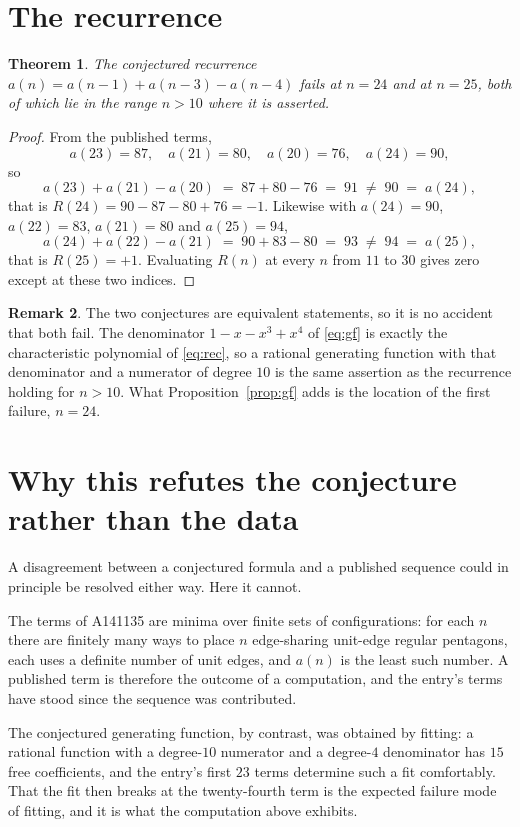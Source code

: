 \documentclass[11pt,a4paper]{article}
\theoremstyle{plain}
\newtheorem{theorem}{Theorem}
\theoremstyle{definition}
\newtheorem{remark}[theorem]{Remark}
\begin{document}
\section{The recurrence}

\begin{theorem}\label{thm:rec}
The conjectured recurrence $a(n)=a(n-1)+a(n-3)-a(n-4)$ fails at $n=24$ and at $n=25$, both
of which lie in the range $n>10$ where it is asserted.
\end{theorem}

\begin{proof}
From the published terms,
\[
a(23)=87,\quad a(21)=80,\quad a(20)=76,\quad a(24)=90,
\]
so
\[
a(23)+a(21)-a(20)\;=\;87+80-76\;=\;91\;\ne\;90\;=\;a(24),
\]
that is $R(24)=90-87-80+76=-1$. Likewise with $a(24)=90$, $a(22)=83$, $a(21)=80$ and
$a(25)=94$,
\[
a(24)+a(22)-a(21)\;=\;90+83-80\;=\;93\;\ne\;94\;=\;a(25),
\]
that is $R(25)=+1$. Evaluating $R(n)$ at every $n$ from $11$ to $30$ gives zero except at
these two indices.
\end{proof}

\begin{remark}
The two conjectures are equivalent statements, so it is no accident that both fail. The
denominator $1-x-x^{3}+x^{4}$ of \eqref{eq:gf} is exactly the characteristic polynomial of
\eqref{eq:rec}, so a rational generating function with that denominator and a numerator of
degree $10$ is the same assertion as the recurrence holding for $n>10$. What
Proposition~\ref{prop:gf} adds is the location of the first failure, $n=24$.
\end{remark}

\section{Why this refutes the conjecture rather than the data}

A disagreement between a conjectured formula and a published sequence could in principle be
resolved either way. Here it cannot.

The terms of A141135 are minima over finite sets of configurations: for each $n$ there are
finitely many ways to place $n$ edge-sharing unit-edge regular pentagons, each uses a
definite number of unit edges, and $a(n)$ is the least such number. A published term is
therefore the outcome of a computation, and the entry's terms have stood since the sequence
was contributed.

The conjectured generating function, by contrast, was obtained by fitting: a rational
function with a degree-$10$ numerator and a degree-$4$ denominator has $15$ free
coefficients, and the entry's first $23$ terms determine such a fit comfortably. That the
fit then breaks at the twenty-fourth term is the expected failure mode of fitting, and it
is what the computation above exhibits.
\end{document}
